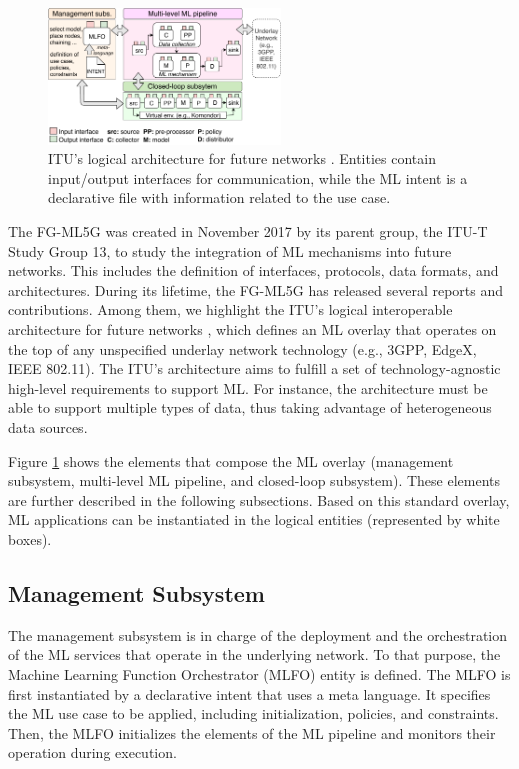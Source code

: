 \documentclass[journal]{IEEEtran}
\begin{document}
\begin{figure}[!ht]
	\centering
	\includegraphics[width=0.55\textwidth]{itu_ml_architecture}
	\caption{ITU's logical architecture for future networks \cite{itu2019architecture}. Entities contain input/output interfaces for communication, while the ML intent is a declarative file with information related to the use case.}
	\label{fig:itu_ml_architecture}
\end{figure}

The FG-ML5G was created in November 2017 by its parent group, the ITU-T Study Group 13, to study the integration of ML mechanisms into future networks. This includes the definition of interfaces, protocols, data formats, and architectures. During its lifetime, the FG-ML5G has released several reports and contributions. Among them, we highlight the ITU's logical interoperable architecture for future networks \cite{itu2019architecture}, which defines an ML overlay that operates on the top of any unspecified underlay network technology (e.g., 3GPP, EdgeX, IEEE 802.11). The ITU's architecture aims to fulfill a set of technology-agnostic high-level requirements to support ML. For instance, the architecture must be able to support multiple types of data, thus taking advantage of heterogeneous data sources. 

Figure \ref{fig:itu_ml_architecture} shows the elements that compose the ML overlay (management subsystem, multi-level ML pipeline, and closed-loop subsystem). These elements are further described in the following subsections. Based on this standard overlay, ML applications can be instantiated in the logical entities (represented by white boxes).

\subsection{Management Subsystem} 
The management subsystem is in charge of the deployment and the orchestration of the ML services that operate in the underlying network. To that purpose, the Machine Learning Function Orchestrator (MLFO) entity is defined. The MLFO is first instantiated by a declarative intent that uses a meta language. It specifies the ML use case to be applied, including initialization, policies, and constraints. Then, the MLFO initializes the elements of the ML pipeline and monitors their operation during execution.
\end{document}
